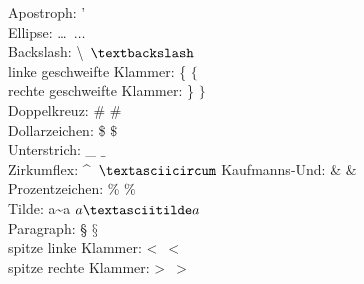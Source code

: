 \documentclass{scrartcl}
\begin{document}
  Apostroph: ' \\
  Ellipse: \dots\ $\ldots$\\
  Backslash: \textbackslash\ $\textbackslash$\\
  linke geschweifte Klammer: \{ $\{$\\
  rechte geschweifte Klammer: \} $\}$\\
  Doppelkreuz: \# $\#$\\
  Dollarzeichen: \$ $\$$\\
  Unterstrich: \_ $\_$\\
  Zirkumflex: \textasciicircum\ $\textasciicircum$
  Kaufmanns-Und: \& $\&$\\
  Prozentzeichen: \% $\%$\\
  Tilde: a\textasciitilde a $a\textasciitilde a$\\
  Paragraph: § $§$\\
  spitze linke Klammer: <\ $<$\\
  spitze rechte Klammer: >\ $>$
\end{document}
